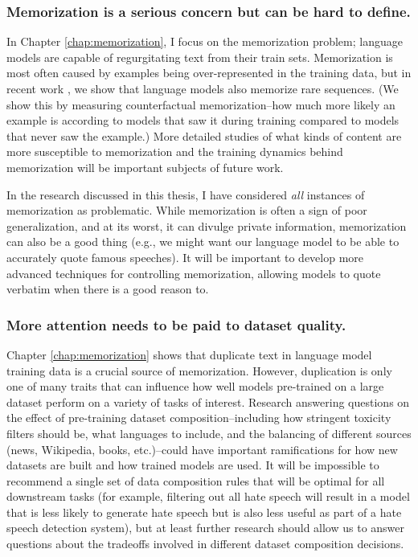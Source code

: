 \subsubsection{Memorization is a serious concern but can be hard to define.}
	In Chapter \ref{chap:memorization}, I focus on the memorization problem; language models are capable of regurgitating text from their train sets.
	Memorization is most often caused by examples being over-represented in the training data, but in recent work \citep{zhang2021counterfactual}, we show that language models also memorize rare sequences.
	(We show this by measuring counterfactual memorization--how much more likely an example is according to models that saw it during training compared to models that never saw the example.)
	More detailed studies of what kinds of content are more susceptible to memorization and the training dynamics behind memorization will be important subjects of future work.

	In the research discussed in this thesis, I have considered \textit{all} instances of memorization as problematic.
	While memorization is often a sign of poor generalization, and at its worst, it can divulge private information, memorization can also be a good thing (e.g., we might want our language model to be able to accurately quote famous speeches).
	It will be important to develop more advanced techniques for controlling memorization, allowing models to quote verbatim when there is a good reason to.

\subsubsection{More attention needs to be paid to dataset quality.}
	Chapter \ref{chap:memorization} shows that duplicate text in language model training data is a crucial source of memorization.
	However, duplication is only one of many traits that can influence how well models pre-trained on a large dataset perform on a variety of tasks of interest.
	Research answering questions on the effect of pre-training dataset composition--including how stringent toxicity filters should be, what languages to include, and the balancing of different sources (news, Wikipedia, books, etc.)--could have important ramifications for how new datasets are built and how trained models are used.
	It will be impossible to recommend a single set of data composition rules that will be optimal for all downstream tasks (for example, filtering out all hate speech will result in a model that is less likely to generate hate speech but is also less useful as part of a hate speech detection system), but at least further research should allow us to answer questions about the tradeoffs involved in different dataset composition decisions. 
	
